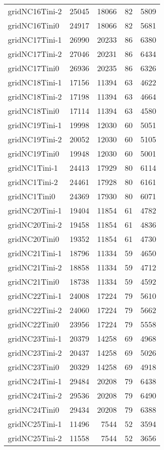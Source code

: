 \begin{longtable}{lrrrr}
gridNC16Tini-2 & 25045 & 18066 & 82 & 5809 \\
gridNC16Tini0 & 24917 & 18066 & 82 & 5681 \\
gridNC17Tini-1 & 26990 & 20233 & 86 & 6380 \\
gridNC17Tini-2 & 27046 & 20231 & 86 & 6434 \\
gridNC17Tini0 & 26936 & 20235 & 86 & 6326 \\
gridNC18Tini-1 & 17156 & 11394 & 63 & 4622 \\
gridNC18Tini-2 & 17198 & 11394 & 63 & 4664 \\
gridNC18Tini0 & 17114 & 11394 & 63 & 4580 \\
gridNC19Tini-1 & 19998 & 12030 & 60 & 5051 \\
gridNC19Tini-2 & 20052 & 12030 & 60 & 5105 \\
gridNC19Tini0 & 19948 & 12030 & 60 & 5001 \\
gridNC1Tini-1 & 24413 & 17929 & 80 & 6114 \\
gridNC1Tini-2 & 24461 & 17928 & 80 & 6161 \\
gridNC1Tini0 & 24369 & 17930 & 80 & 6071 \\
gridNC20Tini-1 & 19404 & 11854 & 61 & 4782 \\
gridNC20Tini-2 & 19458 & 11854 & 61 & 4836 \\
gridNC20Tini0 & 19352 & 11854 & 61 & 4730 \\
gridNC21Tini-1 & 18796 & 11334 & 59 & 4650 \\
gridNC21Tini-2 & 18858 & 11334 & 59 & 4712 \\
gridNC21Tini0 & 18738 & 11334 & 59 & 4592 \\
gridNC22Tini-1 & 24008 & 17224 & 79 & 5610 \\
gridNC22Tini-2 & 24060 & 17224 & 79 & 5662 \\
gridNC22Tini0 & 23956 & 17224 & 79 & 5558 \\
gridNC23Tini-1 & 20379 & 14258 & 69 & 4968 \\
gridNC23Tini-2 & 20437 & 14258 & 69 & 5026 \\
gridNC23Tini0 & 20329 & 14258 & 69 & 4918 \\
gridNC24Tini-1 & 29484 & 20208 & 79 & 6438 \\
gridNC24Tini-2 & 29536 & 20208 & 79 & 6490 \\
gridNC24Tini0 & 29434 & 20208 & 79 & 6388 \\
gridNC25Tini-1 & 11496 & 7544 & 52 & 3594 \\
gridNC25Tini-2 & 11558 & 7544 & 52 & 3656 \\

\end{longtable}
